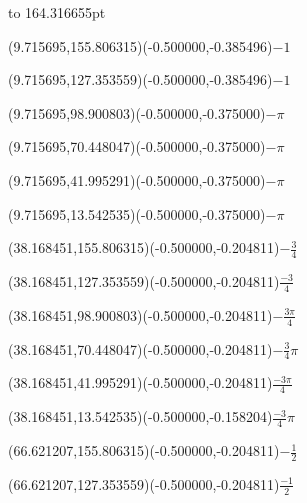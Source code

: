 \documentclass[12pt]{article}
\begin{document}
\makeatletter%
\let\ASYencoding\f@encoding%
\let\ASYfamily\f@family%
\let\ASYseries\f@series%
\let\ASYshape\f@shape%
\makeatother%
\leavevmode\vbox to 164.316655pt{}%
%
%
\fontsize{12.000000}{14.400000}\selectfont%
\usefont{\ASYencoding}{\ASYfamily}{\ASYseries}{\ASYshape}%
\ASYalign(9.715695,155.806315)(-0.500000,-0.385496){$-1$}%
%
%
\fontsize{12.000000}{14.400000}\selectfont%
\ASYalign(9.715695,127.353559)(-0.500000,-0.385496){$-1$}%
%
%
\fontsize{12.000000}{14.400000}\selectfont%
\ASYalign(9.715695,98.900803)(-0.500000,-0.375000){$-\pi$}%
%
%
\fontsize{12.000000}{14.400000}\selectfont%
\ASYalign(9.715695,70.448047)(-0.500000,-0.375000){$-\pi$}%
%
%
\fontsize{12.000000}{14.400000}\selectfont%
\ASYalign(9.715695,41.995291)(-0.500000,-0.375000){$-\pi$}%
%
%
\fontsize{12.000000}{14.400000}\selectfont%
\ASYalign(9.715695,13.542535)(-0.500000,-0.375000){$-\pi$}%
%
%
\fontsize{12.000000}{14.400000}\selectfont%
\ASYalign(38.168451,155.806315)(-0.500000,-0.204811){$-\frac{3}{4}$}%
%
%
\fontsize{12.000000}{14.400000}\selectfont%
\ASYalign(38.168451,127.353559)(-0.500000,-0.204811){$\frac{-3}{4}$}%
%
%
\fontsize{12.000000}{14.400000}\selectfont%
\ASYalign(38.168451,98.900803)(-0.500000,-0.204811){$-\frac{3\pi}{4}$}%
%
%
\fontsize{12.000000}{14.400000}\selectfont%
\ASYalign(38.168451,70.448047)(-0.500000,-0.204811){$-\frac{3}{4}\pi$}%
%
%
\fontsize{12.000000}{14.400000}\selectfont%
\ASYalign(38.168451,41.995291)(-0.500000,-0.204811){$\frac{-3\pi}{4}$}%
%
%
\fontsize{12.000000}{14.400000}\selectfont%
\ASYalign(38.168451,13.542535)(-0.500000,-0.158204){$\displaystyle \frac{-3}{4}\pi$}%
%
%
\fontsize{12.000000}{14.400000}\selectfont%
\ASYalign(66.621207,155.806315)(-0.500000,-0.204811){$-\frac{1}{2}$}%
%
%
\fontsize{12.000000}{14.400000}\selectfont%
\ASYalign(66.621207,127.353559)(-0.500000,-0.204811){$\frac{-1}{2}$}%
%
%
\fontsize{12.000000}{14.400000}\selectfont%
\end{document}

